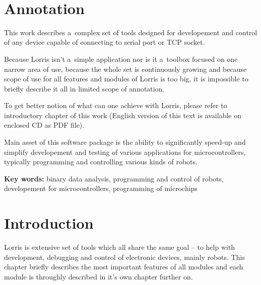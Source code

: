 \documentclass[12pt, a4paper, oneside]{article}
\newcommand{\D}{\medskip \noindent} %
\newcommand{\B}{\textbf} %
\begin{document}
\newpage   %
~ %
\vspace{10mm}

\section*{Annotation}

This work describes a~complex set of tools designed for developement and control of any device capable of connecting to serial port or TCP socket.

Because Lorris isn't a~simple application nor is it a~toolbox focused on one narrow area of use, because the whole set is continuously growing and because scope of use for all features and modules of Lorris is too big, it is impossible to briefly describe it all in limited scope of annotation.

To get better notion of what can one achieve with Lorris, please refer to introductory chapter of this work (English version of this text is available on enclosed CD as PDF file).

Main asset of this software package is the ability to significantly speed-up and simplify developement and testing of various applications for microcontrollers, typically programming and controlling various kinds of robots.

\D \B{Key words:} binary data analysis, programming and control of robots, developement for microcontrollers, programming of microchips

\addtolength{\textheight}{30mm} %

\newpage
\pagestyle{plain}

\setlength{\voffset}{-20mm} %
\setcounter{page}{1}  %

\tableofcontents  %

\addtolength{\textheight}{-30mm} %
\newpage
\setlength{\voffset}{0mm} %
\pagestyle{plain}


\section*{Introduction}
Lorris is extensive set of tools which all share the same goal -- to help with development, debugging and control of electronic devices, mainly robots. This chapter briefly describes the most important features of all modules and each module is throughly described in it's own chapter further on.
\end{document}
